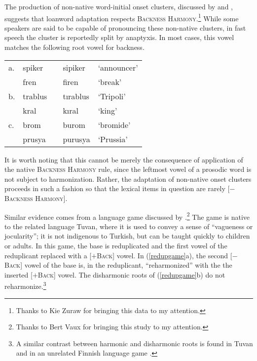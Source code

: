 The production of non-native word-initial onset clusters, discussed by \citet{Clements1982} and \citet{Kaun1999}, suggests that loanword adaptation respects \textsc{Backness Harmony}.\footnote{Thanks to Kie Zuraw for bringing this data to my attention.} While some speakers are said to be capable of pronouncing these non-native clusters, in fast speech the cluster is reportedly split by anaptyxis. In most cases, this vowel matches the following root vowel for backness.

\begin{example} 
\begin{tabular}{lllll}
a. & {spiker}  & \alt{} & {sipiker}  & `announcer' \\
   & {fren}    & \alt{} & {firen}    & `break'     \\
b. & {trablus} & \alt{} & {tırablus} & `Tripoli'   \\
   & {kral}    & \alt{} & {kıral}    & `king'      \\
c. & {brom}    & \alt{} & {burom}    & `bromide'   \\
   & {prusya}  & \alt{} & {purusya}  & `Prussia'   \\
\end{tabular}
\end{example}

\noindent
It is worth noting that this cannot be merely the consequence of application of the native \textsc{Backness Harmony} rule, since the leftmost vowel of a prosodic word is not subject to harmonization. Rather, the adaptation of non-native onset clusters proceeds in such a fashion so that the lexical items in question are rarely [$-$\textsc{Backness Harmony}].

Similar evidence comes from a language game discussed by \citet{Harrison2001}.\footnote{Thanks to Bert Vaux for bringing this study to my attention.} 
The game is native to the related language Tuvan, where it is used to convey a sense of ``vagueness or jocularity''; it is not indigenous to Turkish, but can be taught quickly to children or adults. In this game, the base is reduplicated and the first vowel of the reduplicant replaced with a [$+$\textsc{Back}] vowel. In (\ref{redupgame}a), the second [$-$\textsc{Back}] vowel of the base is, in the reduplicant, ``reharmonized'' with the the inserted [$+$\textsc{Back}] vowel. The disharmonic roots of (\ref{redupgame}b) do not reharmonize.\footnote{A similar contrast between harmonic and disharmonic roots is found in Tuvan \citep{Harrison2001} and in an unrelated Finnish language game \citep{Campbell1986}.}

